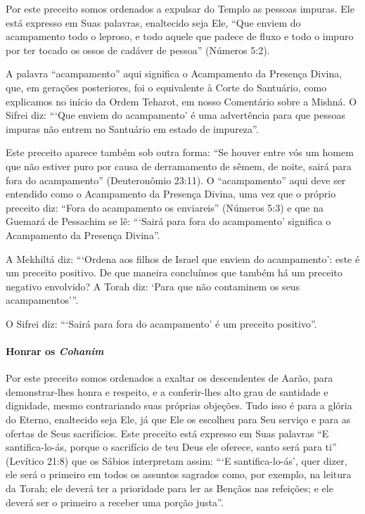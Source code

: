 Por este preceito somos ordenados a expulsar do Templo as pessoas
impuras. Ele está expresso em Suas palavras, enaltecido seja Ele, ``Que
enviem do acampamento todo o leproso, e todo aquele que padece de fluxo
e todo o impuro por ter tocado os ossos de cadáver de pessoa'' (Números
5:2).

A palavra ``acampamento'' aqui significa o Acampamento da Presença
Divina, que, em gerações posteriores, foi o equivalente à Corte do
Santuário, como explicamos no início da Ordem Teharot, em nosso
Comentário sobre a Mishná. O Sifrei diz: ```Que enviem do acampamento'
é uma advertência para que pessoas impuras não entrem no Santuário em
estado de impureza''.

Este preceito aparece também sob outra forma: ``Se houver entre vós
um homem que não estiver puro por causa de derramamento de sêmem, de
noite, sairá para fora do acampamento'' (Deuteronômio 23:11). O
``acampamento'' aqui deve ser entendido como o Acampamento da Presença
Divina, uma vez que o próprio preceito diz: ``Fora do acampamento os
enviareis'' (Números 5:3) e que na Guemará de Pessachim se lê: ```Sairá
para fora do acampamento' significa o Acampamento da Presença Divina''.

A Mekhiltá diz: ```Ordena aos filhos de Israel que enviem do
acampamento': este é um preceito positivo. De que maneira concluímos que
também há um preceito negativo envolvido? A Torah diz: `Para que não
contaminem os seus acampamentos'''.

O Sifrei diz: ```Sairá para fora do acampamento' é um preceito positivo''.

\paragraph{Honrar os \textit{Cohanim}}

Por este preceito somos ordenados a exaltar os descendentes de Aarão,
para demonstrar-lhes honra e respeito, e a conferir-lhes alto grau de
santidade e dignidade, mesmo contrariando suas próprias objeções. Tudo
isso é para a glória do Eterno, enaltecido seja Ele, já que Ele os
escolheu para Seu serviço e para as ofertas de Seus sacrifícios. Este
preceito está expresso em Suas palavras ``E santifica-lo-ás, porque o
sacrifício de teu Deus ele oferece, santo será para ti'' (Levítico 21:8)
que os Sábios interpretam assim: ```E santifica-lo-ás', quer dizer, ele
será o primeiro em todos os assuntos sagrados como, por exemplo, na
leitura da Torah; ele deverá ter a prioridade para ler as Bençãos nas
refeições; e ele deverá ser o primeiro a receber uma porção justa''.

